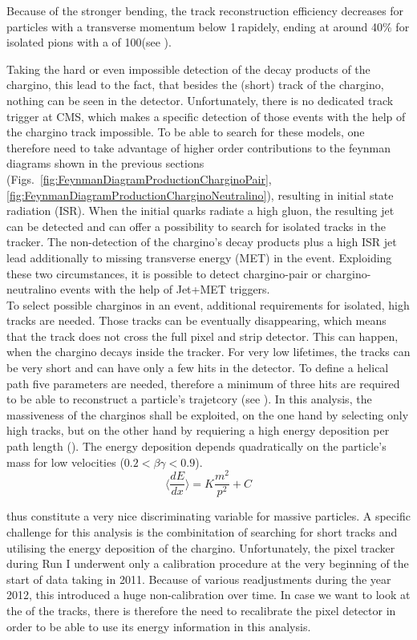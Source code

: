 Because of the stronger bending, the track reconstruction efficiency decreases for particles with a transverse momentum below 1\,\gev rapidely, ending at around 40\% for isolated pions with a \pt of 100\mev (see \cite{bib:CMS:tracking_8TeV}).

Taking the hard or even impossible detection of the decay products of the chargino, this lead to the fact, that besides the (short) track of the chargino, nothing can be seen in the detector.
Unfortunately, there is no dedicated track trigger at CMS, which makes a specific detection of those events with the help of the chargino track impossible.
To be able to search for these models, one therefore need to take advantage of higher order contributions to the feynman diagrams shown in the previous sections (Figs.~\ref{fig:FeynmanDiagramProductionCharginoPair},\ref{fig:FeynmanDiagramProductionCharginoNeutralino}), resulting in initial state radiation (ISR).
When the initial quarks radiate a high \pt gluon, the resulting jet can be detected and can offer a possibility to search for isolated tracks in the tracker.
The non-detection of the chargino's decay products plus a high \pt ISR jet lead additionally to missing transverse energy (MET) in the event. 
Exploiding these two circumstances, it is possible to detect chargino-pair or chargino-neutralino events with the help of Jet+MET triggers.\\

To select possible charginos in an event, additional requirements for isolated, high \pt tracks are needed.
Those tracks can be eventually disappearing, which means that the track does not cross the full pixel and strip detector.
This can happen, when the chargino decays inside the tracker.
For very low lifetimes, the tracks can be very short and can have only a few hits in the detector. 
To define a helical path five parameters are needed, therefore a minimum of three hits are required to be able to reconstruct a particle's trajetcory (see \cite{bib:CMS:tracking_8TeV}).
In this analysis, the massiveness of the charginos shall be exploited, on the one hand by selecting only high \pt tracks, but on the other hand by requiering a high energy deposition per path length (\dedx).
The energy deposition depends quadratically on the particle's mass for low velocities ($0.2<\beta\gamma<0.9$).
\begin{equation}
\langle\frac{dE}{dx}\rangle = K \frac{m^2}{p^2} +C
\end{equation}

thus constitute a very nice discriminating variable for massive particles. 
A specific challenge for this analysis is the combinitation of searching for short tracks and utilising the energy deposition of the chargino.
Unfortunately, the pixel tracker during Run I underwent only a calibration procedure at the very beginning of the start of data taking in 2011.
Because of various readjustments during the year 2012, this introduced a huge non-calibration over time. 
In case we want to look at the \dedx of the tracks, there is therefore the need to recalibrate the pixel detector in order to be able to use its energy information in this analysis.

